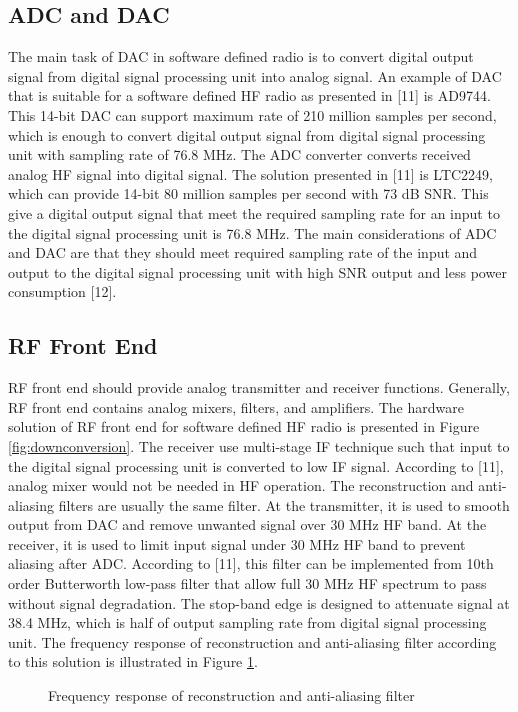 \documentclass[conference]{IEEEtran}
\begin{document}
\subsection{ADC and DAC}
The main task of DAC in software defined radio is to convert digital output signal from digital signal processing unit into analog signal. An example of DAC that is suitable for a software defined HF radio as presented in [11] is AD9744. This 14-bit DAC can support maximum rate of 210 million samples per second, which is enough to convert digital output signal from digital signal processing unit with sampling rate of 76.8 MHz.
The ADC converter converts received analog HF signal into digital signal. The solution presented in [11] is LTC2249, which can provide 14-bit 80 million samples per second with 73 dB SNR. This give a digital output signal that meet the required sampling rate for an input to the digital signal processing unit is 76.8 MHz. 
The main considerations of ADC and DAC are that they should meet required sampling rate of the input and output to the digital signal processing unit with high SNR output and less power consumption [12].
\subsection{RF Front End}
RF front end should provide analog transmitter and receiver functions. Generally, RF front end contains analog mixers, filters, and amplifiers. The hardware solution of RF front end for software defined HF radio is presented in Figure \ref{fig:downconversion}. The receiver use multi-stage IF technique such that input to the digital signal processing unit is converted to low IF signal. According to [11], analog mixer would not be needed in HF operation.
The reconstruction and anti-aliasing filters are usually the same filter. At the transmitter, it is used to smooth output from DAC and remove unwanted signal over 30 MHz HF band. At the receiver, it is used to limit input signal under 30 MHz HF band to prevent aliasing after ADC. According to [11], this filter can be implemented from 10th order Butterworth low-pass filter that allow full 30 MHz HF spectrum to pass without signal degradation. The stop-band edge is designed to attenuate signal at 38.4 MHz, which is half of output sampling rate from digital signal processing unit. The frequency response of reconstruction and anti-aliasing filter according to this solution is illustrated in Figure \ref{fig:freq_resp}.

\begin{figure}[h!]
	\centering
	\caption{Frequency response of reconstruction and anti-aliasing filter}
	\label{fig:freq_resp}
\end{figure}
\end{document}
